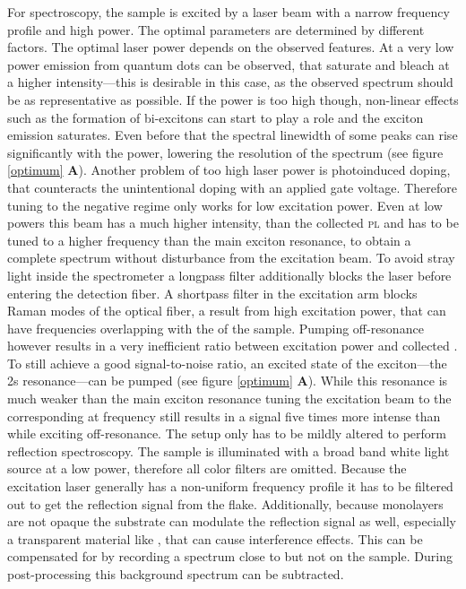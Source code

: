 For \pl spectroscopy, the sample is excited by a laser beam with a narrow frequency profile and high power. The optimal parameters are determined by different factors. The optimal laser power depends on the observed features. At a very low power emission from quantum dots can be observed, that saturate and bleach at a higher intensity---this is desirable in this case, as the observed spectrum should be as representative as possible. If the power is too high though, non-linear effects such as the formation of bi-excitons can start to play a role and the exciton emission saturates. Even before that the spectral linewidth of some peaks can rise significantly with the power, lowering the resolution of the spectrum (see figure \ref{optimum} \textbf{A}). Another problem of too high laser power is photoinduced doping, that counteracts the unintentional doping with an applied gate voltage\cite{wang_photoinduced_2016,cunningham_photoinduced_2017}. Therefore tuning to the negative regime only works for low excitation power. Even at low powers this beam has a much higher intensity, than the collected \textsc{pl} and has to be tuned to a higher frequency than the main exciton resonance, to obtain a complete spectrum without disturbance from the excitation beam. To avoid stray light inside the spectrometer a longpass filter additionally blocks the laser before entering the detection fiber. A shortpass filter in the excitation arm blocks Raman modes of the optical fiber, a result from high excitation power, that can have frequencies overlapping with the \pl of the sample. Pumping off-resonance however results in a very inefficient ratio between excitation power and collected \pl\!. To still achieve a good signal-to-noise ratio, an excited state of the exciton---the 2s resonance---can be pumped (see figure \ref{optimum} \textbf{A}). While this resonance is much weaker than the main exciton resonance tuning the excitation beam to the corresponding at frequency still results in a signal five times more intense than while exciting off-resonance.
The setup only has to be mildly altered to perform reflection spectroscopy. The sample is illuminated with a broad band white light source at a low power, therefore all color filters are omitted. Because the excitation laser generally has a non-uniform frequency profile it has to be filtered out to get the reflection signal from the \wse flake. Additionally, because \tmdg monolayers are not opaque the substrate can modulate the reflection signal as well, especially a transparent material like \hbn, that can cause interference effects. This can be compensated for by recording a spectrum close to but not on the sample. During post-processing this background spectrum can be subtracted.

